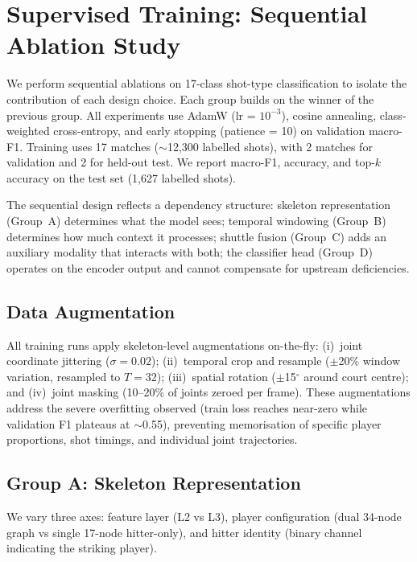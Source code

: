 \documentclass[11pt,a4paper]{article}
\begin{document}
\section{Supervised Training: Sequential Ablation Study}

We perform sequential ablations on 17-class shot-type classification to isolate the contribution of each design choice. Each group builds on the winner of the previous group. All experiments use AdamW (lr = $10^{-3}$), cosine annealing, class-weighted cross-entropy, and early stopping (patience = 10) on validation macro-F1. Training uses 17 matches ($\sim$12,300 labelled shots), with 2 matches for validation and 2 for held-out test. We report macro-F1, accuracy, and top-$k$ accuracy on the test set (1,627 labelled shots).

The sequential design reflects a dependency structure: skeleton representation (Group~A) determines what the model sees; temporal windowing (Group~B) determines how much context it processes; shuttle fusion (Group~C) adds an auxiliary modality that interacts with both; the classifier head (Group~D) operates on the encoder output and cannot compensate for upstream deficiencies.

\subsection{Data Augmentation}

All training runs apply skeleton-level augmentations on-the-fly: (i)~joint coordinate jittering ($\sigma = 0.02$); (ii)~temporal crop and resample ($\pm$20\% window variation, resampled to $T=32$); (iii)~spatial rotation ($\pm$15$^\circ$ around court centre); and (iv)~joint masking (10--20\% of joints zeroed per frame). These augmentations address the severe overfitting observed (train loss reaches near-zero while validation F1 plateaus at $\sim$0.55), preventing memorisation of specific player proportions, shot timings, and individual joint trajectories.

\subsection{Group A: Skeleton Representation}

We vary three axes: feature layer (L2 vs L3), player configuration (dual 34-node graph vs single 17-node hitter-only), and hitter identity (binary channel indicating the striking player).
\end{document}
